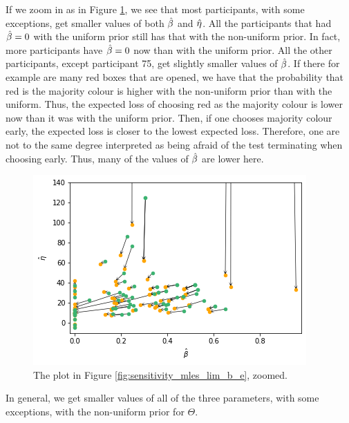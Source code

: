 If we zoom in as in Figure \ref{fig:sensitivity_mles_lim_b_e_zoomed}, we see that most participants, with some exceptions, get smaller values of both $\hat{\beta}$ and $\hat{\eta}$. All the participants that had $\hat{\beta}=0$ with the uniform prior still has that with the non-uniform prior. In fact, more participants have $\hat{\beta}=0$ now than with the uniform prior. All the other participants, except participant 75, get slightly smaller values of $\hat{\beta}$.
If there for example are many red boxes that are opened, we have that the probability that red is the majority colour is higher with the non-uniform prior than with the uniform. Thus, the expected loss of choosing red as the majority colour is lower now than it was with the uniform prior. Then, if one chooses majority colour early, the expected loss is closer to the lowest expected loss. Therefore, one are not to the same degree interpreted as being afraid of the test terminating when choosing early. Thus, many of the values of $\hat{\beta}$ are lower here. 
\begin{figure}
    \centering
    \includegraphics[scale=0.8]{pictures/Sensitivity/mles_lim_b_e_zoomed.png}
    \caption[MLEs of $\beta$ and $\eta$, zoomed]{The plot in Figure \ref{fig:sensitivity_mles_lim_b_e}, zoomed.}
    \label{fig:sensitivity_mles_lim_b_e_zoomed}
\end{figure}

In general, we get smaller values of all of the three parameters, with some exceptions, with the non-uniform prior for $\Theta$.


